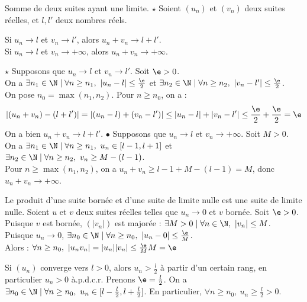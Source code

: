 \documentclass[11pt]{article}
\begin{document}
\begin{prop}{Somme de deux suites ayant une limite. $\star$}{}
    Soient $(u_n)$ et $(v_n)$ deux suites réelles, et $l,l'$ deux nombres réels.
    \begin{center}
        Si $u_n\to l$ et $v_n\to l'$, alors $u_n + v_n\to l + l'$.\\
        Si $u_n\to l$ et $v_n \to +\infty$, alors $u_n+v_n\to+\infty$.
    \end{center}
    \tcblower
    $\star$ Supposons que $u_n\to l$ et $v_n\to l'$. Soit $\e>0$.\\
    On a $\exists n_1 \in \N \mid \forall n \geq n_1, ~ |u_n - l| \leq \frac{\e}{2}$ et $\exists n_2 \in \N \mid \forall n \geq n_2, ~ |v_n - l'| \leq \frac{\e}{2}$.\\
    On pose $n_0=\max(n_1,n_2)$. Pour $n\geq n_0$, on a :
    \begin{equation*}
        |(u_n + v_n) - (l + l')| = |(u_n - l) + (v_n - l')| \leq |u_n - l| + |v_n - l'| \leq \frac{\e}{2} + \frac{\e}{2} = \e
    \end{equation*}
    On a bien $u_n + v_n \to l + l'$.\n
    $\bullet$ Supposons que $u_n \to l$ et $v_n \to +\infty$. Soit $M>0$.\\
    On a $\exists n_1 \in \N \mid \forall n \geq n_1, ~ u_n\in[l-1, l+1]$ et $\exists n_2\in\N\mid \forall n \geq n_2, ~ v_n \geq M - (l - 1)$.\\
    Pour $n\geq\max(n_1,n_2)$, on a $u_n+v_n\geq l-1 + M - (l-1) = M$, donc $u_n+v_n\to+\infty$.
\end{prop}

\begin{lemme}{}{}
    Le produit d'une suite bornée et d'une suite de limite nulle est une suite de limite nulle.
    \tcblower
    Soient $u$ et $v$ deux suites réelles telles que $u_n\to 0$ et $v$ bornée. Soit $\e>0$.\\
    Puisque $v$ est bornée, $(|v_n|)$ est majorée : $\exists M > 0 \mid \forall n \in \N, ~ |v_n| \leq M$.\\
    Puisque $u_n\to0$, $\exists n_0\in\N \mid \forall n \geq n_0, ~ |u_n-0|\leq\frac{\e}{M}$.\\
    Alors : $\forall n \geq n_0, ~ |u_nv_n|=|u_n||v_n|\leq \frac{\e}{M}M=\e$
\end{lemme}

\begin{lemme}{}{}
    Si $(u_n)$ converge vers $l>0$, alors $u_n>\frac{l}{2}$ à partir d'un certain rang, en particulier $u_n>0$ à.p.d.c.r.
    \tcblower
    Prenons $\e=\frac{l}{2}$. On a $\exists n_0 \in \N \mid \forall n\geq n_0, ~ u_n \in [l-\frac{l}{2},l+\frac{l}{2}]$. En particulier, $\forall n \geq n_0, ~ u_n \geq \frac{l}{2} > 0$.
\end{lemme}
\end{document}
